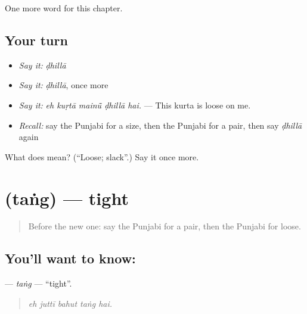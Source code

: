 \begin{grammarlens}[title={What you've built}]
One more word for this chapter.
\end{grammarlens}

\subsection*{Your turn}
\begin{itemize}
\raggedright
  \item \emph{Say it:} \emph{ḍhillā}
  \item \emph{Say it:} \emph{ḍhillā}, once more
  \item \emph{Say it:} \emph{eh kuṛtā mainū̃ ḍhillā hai.} — This kurta is loose on me.
  \item \emph{Recall:} say the Punjabi for a size, then the Punjabi for a pair, then say \emph{ḍhillā} again
\end{itemize}

\begin{tcolorbox}[breakable,colback=teal!4,colframe=teal!35!black,title={Before you move on}]
What does  mean? (\textquotedblleft{}Loose; slack\textquotedblright{}.) Say it once more.
\end{tcolorbox}
\section[\texorpdfstring{\pa{ਤੰਗ} (taṅg)}{ਤੰਗ (taṅg)}]{ (taṅg) — tight}

\label{lesson:PA-C275-tang}



\begin{quote}
Before the new one: say the Punjabi for a pair, then the Punjabi for loose.
\end{quote}

\subsection*{You'll want to know: }
\textbf{} — \emph{taṅg} — \textquotedblleft{}tight\textquotedblright{}.

\begin{quote}
    
\end{quote}

\begin{quote}
\emph{eh juttī bahut taṅg hai.}
\end{quote}

